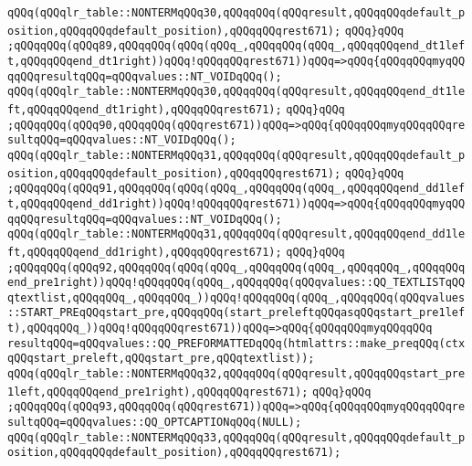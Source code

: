 \verb|qQQq(qQQqlr_table::NONTERMqQQq30,qQQqqQQq(qQQqresult,qQQqqQQqdefault_position,qQQqqQQqdefault_position),qQQqqQQqrest671);|\newline
\verb|qQQq}qQQq|\newline
\verb|;qQQqqQQq(qQQq89,qQQqqQQq(qQQq(qQQq_,qQQqqQQq(qQQq_,qQQqqQQqend_dt1left,qQQqqQQqend_dt1right))qQQq!qQQqqQQqrest671))qQQq=>qQQq{qQQqqQQqmyqQQqqQQqresultqQQq=qQQqvalues::NT_VOIDqQQq();|\newline
\verb|qQQq(qQQqlr_table::NONTERMqQQq30,qQQqqQQq(qQQqresult,qQQqqQQqend_dt1left,qQQqqQQqend_dt1right),qQQqqQQqrest671);|\newline
\verb|qQQq}qQQq|\newline
\verb|;qQQqqQQq(qQQq90,qQQqqQQq(qQQqrest671))qQQq=>qQQq{qQQqqQQqmyqQQqqQQqresultqQQq=qQQqvalues::NT_VOIDqQQq();|\newline
\verb|qQQq(qQQqlr_table::NONTERMqQQq31,qQQqqQQq(qQQqresult,qQQqqQQqdefault_position,qQQqqQQqdefault_position),qQQqqQQqrest671);|\newline
\verb|qQQq}qQQq|\newline
\verb|;qQQqqQQq(qQQq91,qQQqqQQq(qQQq(qQQq_,qQQqqQQq(qQQq_,qQQqqQQqend_dd1left,qQQqqQQqend_dd1right))qQQq!qQQqqQQqrest671))qQQq=>qQQq{qQQqqQQqmyqQQqqQQqresultqQQq=qQQqvalues::NT_VOIDqQQq();|\newline
\verb|qQQq(qQQqlr_table::NONTERMqQQq31,qQQqqQQq(qQQqresult,qQQqqQQqend_dd1left,qQQqqQQqend_dd1right),qQQqqQQqrest671);|\newline
\verb|qQQq}qQQq|\newline
\verb|;qQQqqQQq(qQQq92,qQQqqQQq(qQQq(qQQq_,qQQqqQQq(qQQq_,qQQqqQQq_,qQQqqQQqend_pre1right))qQQq!qQQqqQQq(qQQq_,qQQqqQQq(qQQqvalues::QQ_TEXTLISTqQQqtextlist,qQQqqQQq_,qQQqqQQq_))qQQq!qQQqqQQq(qQQq_,qQQqqQQq(qQQqvalues::START_PREqQQqstart_pre,qQQqqQQq(start_preleftqQQqasqQQqstart_pre1left),qQQqqQQq_))qQQq!qQQqqQQqrest671))qQQq=>qQQq{qQQqqQQqmyqQQqqQQq|\newline
\verb|resultqQQq=qQQqvalues::QQ_PREFORMATTEDqQQq(htmlattrs::make_preqQQq(ctxqQQqstart_preleft,qQQqstart_pre,qQQqtextlist));|\newline
\verb|qQQq(qQQqlr_table::NONTERMqQQq32,qQQqqQQq(qQQqresult,qQQqqQQqstart_pre1left,qQQqqQQqend_pre1right),qQQqqQQqrest671);|\newline
\verb|qQQq}qQQq|\newline
\verb|;qQQqqQQq(qQQq93,qQQqqQQq(qQQqrest671))qQQq=>qQQq{qQQqqQQqmyqQQqqQQqresultqQQq=qQQqvalues::QQ_OPTCAPTIONqQQq(NULL);|\newline
\verb|qQQq(qQQqlr_table::NONTERMqQQq33,qQQqqQQq(qQQqresult,qQQqqQQqdefault_position,qQQqqQQqdefault_position),qQQqqQQqrest671);|\newline
